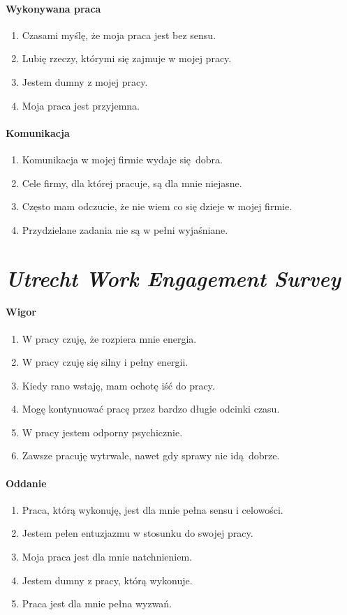 \paragraph{Wykonywana praca}
\begin{enumerate}
  \item Czasami myślę, że moja praca jest bez sensu.
  \item Lubię rzeczy, którymi się zajmuje w mojej pracy.
  \item Jestem dumny z mojej pracy.
  \item Moja praca jest przyjemna.
\end{enumerate}

\paragraph{Komunikacja}
\begin{enumerate}
  \item Komunikacja w mojej firmie wydaje się dobra.
  \item Cele firmy, dla której pracuje, są dla mnie niejasne.
  \item Często mam odczucie, że nie wiem co się dzieje w mojej firmie.
  \item Przydzielane zadania nie są w pełni wyjaśniane.
\end{enumerate}

\section{\emph{Utrecht Work Engagement Survey}}
\label{sec:uwes-text}
\paragraph{Wigor}
\begin{enumerate}
  \item W pracy czuję, że rozpiera mnie energia.
  \item W pracy czuję się silny i pełny energii.
  \item Kiedy rano wstaję, mam ochotę iść do pracy.
  \item Mogę kontynuować pracę przez bardzo długie odcinki czasu.
  \item W pracy jestem odporny psychicznie.
  \item Zawsze pracuję wytrwale, nawet gdy sprawy nie idą dobrze.
\end{enumerate}

\paragraph{Oddanie}
\begin{enumerate}
  \item Praca, którą wykonuję, jest dla mnie pełna sensu i celowości.
  \item Jestem pełen entuzjazmu w stosunku do swojej pracy.
  \item Moja praca jest dla mnie natchnieniem.
  \item Jestem dumny z pracy, którą wykonuje.
  \item Praca jest dla mnie pełna wyzwań.
\end{enumerate}

